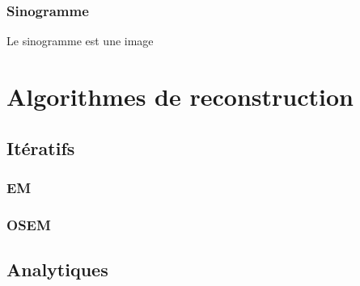 		\subsection{Sinogramme}

Le sinogramme est une image 
\chapter{Algorithmes de reconstruction}
	\section{Itératifs}
		\subsection{EM}
		\subsection{OSEM}
	\section{Analytiques}
